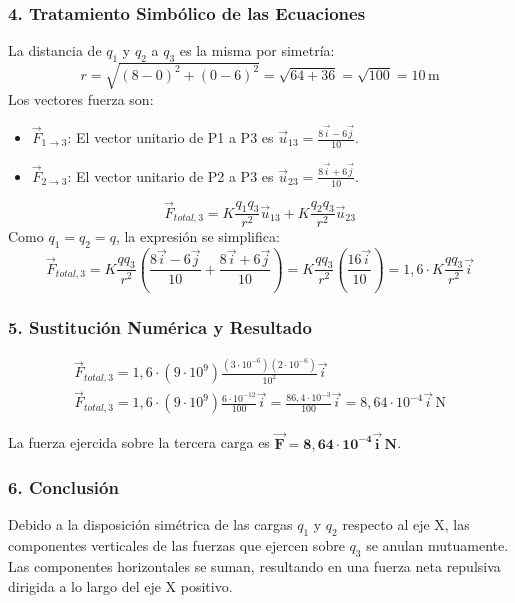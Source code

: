 \subsubsection*{4. Tratamiento Simbólico de las Ecuaciones}
La distancia de $q_1$ y $q_2$ a $q_3$ es la misma por simetría:
$$ r = \sqrt{(8-0)^2 + (0-6)^2} = \sqrt{64+36} = \sqrt{100} = 10 \, \text{m} $$
Los vectores fuerza son:
\begin{itemize}
    \item $\vec{F}_{1\to3}$: El vector unitario de P1 a P3 es $\vec{u}_{13} = \frac{8\vec{i}-6\vec{j}}{10}$.
    \item $\vec{F}_{2\to3}$: El vector unitario de P2 a P3 es $\vec{u}_{23} = \frac{8\vec{i}+6\vec{j}}{10}$.
\end{itemize}
$$ \vec{F}_{total,3} = K\frac{q_1q_3}{r^2}\vec{u}_{13} + K\frac{q_2q_3}{r^2}\vec{u}_{23} $$
Como $q_1=q_2=q$, la expresión se simplifica:
$$ \vec{F}_{total,3} = K\frac{qq_3}{r^2} \left( \frac{8\vec{i}-6\vec{j}}{10} + \frac{8\vec{i}+6\vec{j}}{10} \right) = K\frac{qq_3}{r^2} \left( \frac{16\vec{i}}{10} \right) = 1,6 \cdot K\frac{qq_3}{r^2}\vec{i} $$

\subsubsection*{5. Sustitución Numérica y Resultado}
\begin{gather}
    \vec{F}_{total,3} = 1,6 \cdot (9\cdot10^9) \frac{(3\cdot10^{-6})(2\cdot10^{-6})}{10^2} \vec{i} \\
    \vec{F}_{total,3} = 1,6 \cdot (9\cdot10^9) \frac{6\cdot10^{-12}}{100} \vec{i} = \frac{86,4 \cdot 10^{-3}}{100} \vec{i} = 8,64 \cdot 10^{-4} \vec{i} \, \text{N}
\end{gather}
\begin{cajaresultado}
La fuerza ejercida sobre la tercera carga es $\boldsymbol{\vec{F} = 8,64 \cdot 10^{-4} \vec{i} \, \textbf{N}}$.
\end{cajaresultado}

\subsubsection*{6. Conclusión}
\begin{cajaconclusion}
Debido a la disposición simétrica de las cargas $q_1$ y $q_2$ respecto al eje X, las componentes verticales de las fuerzas que ejercen sobre $q_3$ se anulan mutuamente. Las componentes horizontales se suman, resultando en una fuerza neta repulsiva dirigida a lo largo del eje X positivo.
\end{cajaconclusion}

